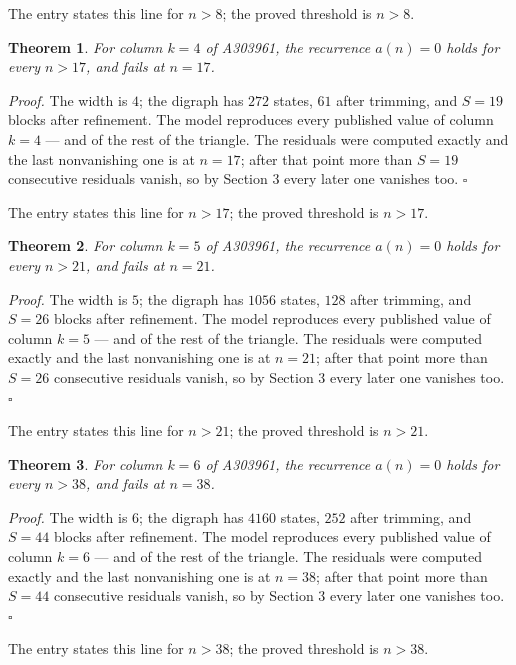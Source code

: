 \documentclass[11pt]{article}
\newtheorem{theorem}{Theorem}
\theoremstyle{definition}
\begin{document}
The entry states this line for $n > 8$; the proved threshold is $n > 8$.

\begin{theorem} For column $k = 4$ of A303961, the recurrence $a(n) = 0$ holds for every $n > 17$, and fails at $n = 17$.\end{theorem}

{\itshape Proof.} The width is $4$; the digraph has $272$ states, $61$ after trimming, and $S = 19$ blocks after refinement. The model reproduces every published value of column $k = 4$ --- and of the rest of the triangle. The residuals were computed exactly and the last nonvanishing one is at $n = 17$; after that point more than $S = 19$ consecutive residuals vanish, so by Section 3 every later one vanishes too. $\square$

The entry states this line for $n > 17$; the proved threshold is $n > 17$.

\begin{theorem} For column $k = 5$ of A303961, the recurrence $a(n) = 0$ holds for every $n > 21$, and fails at $n = 21$.\end{theorem}

{\itshape Proof.} The width is $5$; the digraph has $1056$ states, $128$ after trimming, and $S = 26$ blocks after refinement. The model reproduces every published value of column $k = 5$ --- and of the rest of the triangle. The residuals were computed exactly and the last nonvanishing one is at $n = 21$; after that point more than $S = 26$ consecutive residuals vanish, so by Section 3 every later one vanishes too. $\square$

The entry states this line for $n > 21$; the proved threshold is $n > 21$.

\begin{theorem} For column $k = 6$ of A303961, the recurrence $a(n) = 0$ holds for every $n > 38$, and fails at $n = 38$.\end{theorem}

{\itshape Proof.} The width is $6$; the digraph has $4160$ states, $252$ after trimming, and $S = 44$ blocks after refinement. The model reproduces every published value of column $k = 6$ --- and of the rest of the triangle. The residuals were computed exactly and the last nonvanishing one is at $n = 38$; after that point more than $S = 44$ consecutive residuals vanish, so by Section 3 every later one vanishes too. $\square$

The entry states this line for $n > 38$; the proved threshold is $n > 38$.
\end{document}
